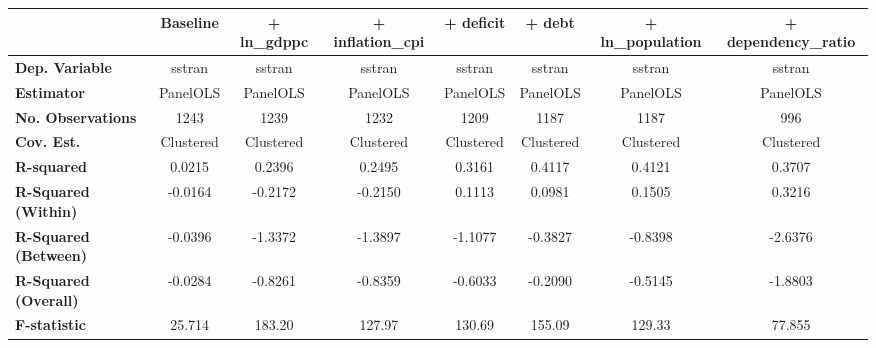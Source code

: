 \begin{center}
\begin{tabular}{lccccccc}
\toprule
                                   & \textbf{Baseline} & \textbf{+ ln\_gdppc} & \textbf{+ inflation\_cpi} & \textbf{+ deficit} & \textbf{+ debt} & \textbf{+ ln\_population} & \textbf{+ dependency\_ratio}  \\
\midrule
\textbf{Dep. Variable}             &       sstran      &        sstran        &           sstran          &       sstran       &      sstran     &           sstran          &            sstran             \\
\textbf{Estimator}                 &      PanelOLS     &       PanelOLS       &          PanelOLS         &      PanelOLS      &     PanelOLS    &          PanelOLS         &           PanelOLS            \\
\textbf{No. Observations}          &        1243       &         1239         &            1232           &        1209        &       1187      &            1187           &             996               \\
\textbf{Cov. Est.}                 &     Clustered     &      Clustered       &         Clustered         &     Clustered      &    Clustered    &         Clustered         &          Clustered            \\
\textbf{R-squared}                 &       0.0215      &        0.2396        &           0.2495          &       0.3161       &      0.4117     &           0.4121          &            0.3707             \\
\textbf{R-Squared (Within)}        &      -0.0164      &       -0.2172        &          -0.2150          &       0.1113       &      0.0981     &           0.1505          &            0.3216             \\
\textbf{R-Squared (Between)}       &      -0.0396      &       -1.3372        &          -1.3897          &      -1.1077       &     -0.3827     &          -0.8398          &           -2.6376             \\
\textbf{R-Squared (Overall)}       &      -0.0284      &       -0.8261        &          -0.8359          &      -0.6033       &     -0.2090     &          -0.5145          &           -1.8803             \\
\textbf{F-statistic}               &       25.714      &        183.20        &           127.97          &       130.69       &      155.09     &           129.33          &            77.855             \\

\end{tabular}
\end{center}
